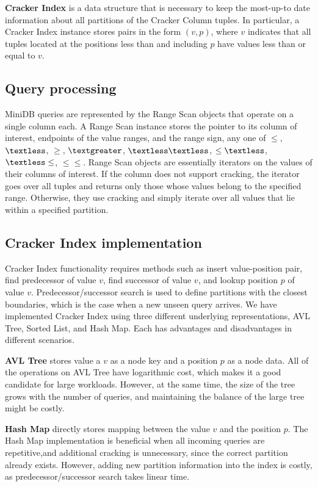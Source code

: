 \textbf{Cracker Index} is a data structure that is necessary to keep the most-up-to date information about all partitions of the Cracker Column tuples. In particular, a Cracker Index instance stores pairs in the form $(v, p)$, where $v$ indicates that all tuples located at the positions less than and including $p$ have values less than or equal to $v$.

\subsection{Query processing}
MiniDB queries are represented by the Range Scan objects that operate on a single column each. A Range Scan instance stores the pointer to its column of interest, endpoints of the value ranges, and the range sign, any one of $\leq$, $\textless$, $\geq$, $\textgreater$, $\textless \textless$, $\leq \textless$, $\textless \leq$, $\leq \leq$. Range Scan objects are essentially iterators on the values of their columns of interest. If the column does not support cracking, the iterator goes over all tuples and returns only those whose values belong to the specified range. Otherwise, they use cracking and simply iterate over all values that lie within a specified partition. 


\subsection{Cracker Index implementation}
Cracker Index functionality requires methods such as insert value-position pair, find predecessor of value $v$, find successor of value $v$, and lookup position $p$ of value $v$. Predecessor/successor search is used to define partitions with the closest boundaries, which is the case when a new unseen query arrives. We have implemented Cracker Index using three different underlying representations, AVL Tree, Sorted List, and Hash Map. Each has advantages and disadvantages in different scenarios.

\textbf{AVL Tree} stores value a $v$ as a node key and a position $p$ as a node data. All of the operations on AVL Tree have logarithmic cost, which makes it a good candidate for large workloads. However, at the same time, the size of the tree grows with the number of queries, and maintaining the balance of the large tree might be costly.

\textbf{Hash Map} directly stores mapping between the value $v$ and the position $p$. The Hash Map implementation is beneficial when all incoming queries are repetitive,and additional cracking is unnecessary, since the correct partition already exists. However, adding new partition information into the index is costly, as predecessor/successor search takes linear time.

